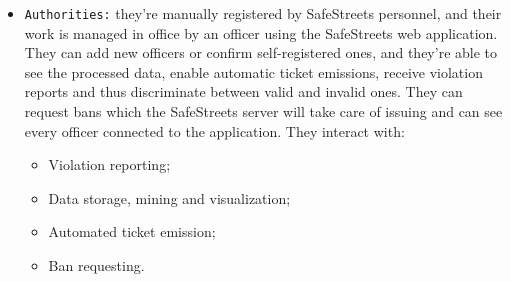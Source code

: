 \documentclass[12pt,a4paper]{article}
\begin{document}
\begin{itemize}
\item  \texttt{Authorities:} they're manually registered by SafeStreets personnel, and their work is managed in office by an officer using the SafeStreets web application. They can add new officers or confirm self-registered ones, and they're able to see the processed data, enable automatic ticket emissions, receive violation reports and thus discriminate between valid and invalid ones. They can request bans which the SafeStreets server will take care of issuing and can see every officer connected to the application. They interact with: 
		\begin{itemize}
			\item Violation reporting;
			\item Data storage, mining and visualization;
			\item Automated ticket emission;
			\item Ban requesting.
		\end{itemize}

\end{itemize}
\end{document}
